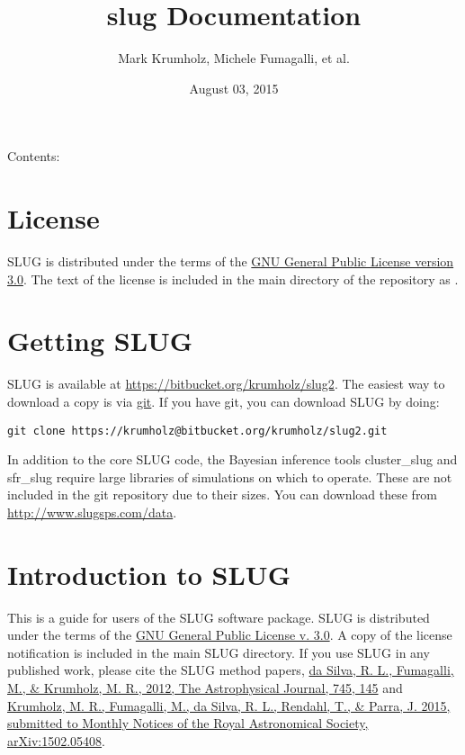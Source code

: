 \documentclass[letterpaper,10pt,english]{sphinxmanual}
\title{slug Documentation}
\date{August 03, 2015}
\author{Mark Krumholz, Michele Fumagalli, et al.}
\begin{document}
\maketitle
\tableofcontents
{}\label{index::doc}


Contents:


\chapter{License}
\label{license::doc}\label{license:welcome-to-slug-s-documentation}\label{license:license}
SLUG is distributed under the terms of the \href{http://www.gnu.org/copyleft/gpl.html}{GNU General Public License version 3.0}. The text of the license is included in the main directory of the repository as .


\chapter{Getting SLUG}
\label{getting:getting-slug}\label{getting::doc}
SLUG is available at \href{https://bitbucket.org/krumholz/slug2}{https://bitbucket.org/krumholz/slug2}. The easiest way to download a copy is via \href{http://git-scm.com/}{git}. If you have git, you can download SLUG by doing:

\begin{Verbatim}[commandchars=\\\{\}]
git clone https://krumholz@bitbucket.org/krumholz/slug2.git
\end{Verbatim}

In addition to the core SLUG code, the Bayesian inference tools cluster\_slug and sfr\_slug require large libraries of simulations on which to operate. These are not included in the git repository due to their sizes. You can download these from \href{http://www.slugsps.com/data}{http://www.slugsps.com/data}.


\chapter{Introduction to SLUG}
\label{intro:introduction-to-slug}\label{intro::doc}
This is a guide for users of the SLUG software package. SLUG is distributed under the terms of the \href{http://www.gnu.org/licenses/gpl.html}{GNU General Public License v. 3.0}. A copy of the license notification is included in the main SLUG directory. If you use SLUG in any published work, please cite the SLUG method papers, \href{http://adsabs.harvard.edu/abs/2012ApJ...745..145D}{da Silva, R. L., Fumagalli, M., \& Krumholz, M. R., 2012, The Astrophysical Journal, 745, 145} and \href{http://adsabs.harvard.edu/abs/2015arXiv150205408K}{Krumholz, M. R., Fumagalli, M., da Silva, R. L., Rendahl, T., \& Parra, J. 2015, submitted to Monthly Notices of the Royal Astronomical Society, arXiv:1502.05408}.
\end{document}
